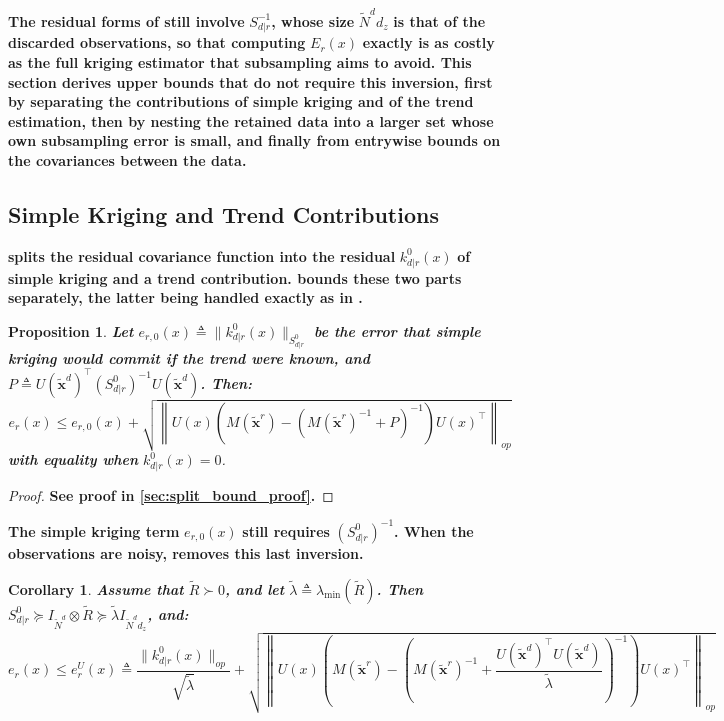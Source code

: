 \documentclass[preprint]{elsarticle}
\newtheorem{proposition}{Proposition}
\newtheorem{corollary}{Corollary}[proposition]
\begin{document}
\textbf{The residual forms of  still involve} $S_{d|r}^{-1}$\textbf{, whose size} $\tilde{N}^dd_z$ \textbf{is that of the discarded observations, so that computing} $E_r(x)$ \textbf{exactly is as costly as the full kriging estimator that subsampling aims to avoid. This section derives upper bounds that do not require this inversion, first by separating the contributions of simple kriging and of the trend estimation, then by nesting the retained data into a larger set whose own subsampling error is small, and finally from entrywise bounds on the covariances between the data.}

\subsection{Simple Kriging and Trend Contributions}\label{sec:split_bound}

\textbf{ splits the residual covariance function into the residual} $k^0_{d|r}(x)$ \textbf{of simple kriging and a trend contribution.  bounds these two parts separately, the latter being handled exactly as in .}

\begin{proposition}
    \textbf{Let} $e_{r,0}(x)\triangleq\|k^0_{d|r}(x)\|_{S^0_{d|r}}$ \textbf{be the error that simple kriging would commit if the trend were known, and} $P\triangleq U(\tilde{\mathbf{x}}^d)^\top \left(S^0_{d|r}\right)^{-1}U(\tilde{\mathbf{x}}^d)$\textbf{. Then:}
    \begin{equation*}
        e_r(x)\leq e_{r,0}(x)+\sqrt{\left\|U(x)\left(M(\tilde{\mathbf{x}}^r)-\left(M(\tilde{\mathbf{x}}^r)^{-1}+P\right)^{-1}\right)U(x)^\top\right\|_{op}}
    \end{equation*}
    \textbf{with equality when} $k^0_{d|r}(x)=0$.\label{th:split_bound}
\end{proposition}

\begin{proof}
    \textbf{See proof in \cref{sec:split_bound_proof}.}
\end{proof}

\textbf{The simple kriging term} $e_{r,0}(x)$ \textbf{still requires} $\left(S^0_{d|r}\right)^{-1}$\textbf{. When the observations are noisy,  removes this last inversion.}

\begin{corollary}
    \textbf{Assume that} $\tilde{R}\succ0$\textbf{, and let} $\tilde{\lambda}\triangleq\lambda_{\min}(\tilde{R})$\textbf{. Then} $S^0_{d|r}\succeq I_{\tilde{N}^d}\otimes\tilde{R}\succeq\tilde{\lambda}I_{\tilde{N}^dd_z}$\textbf{, and:}
    \begin{equation*}
        e_r(x)\leq e_r^U(x)\triangleq\frac{\|k^0_{d|r}(x)\|_{op}}{\sqrt{\tilde{\lambda}}}+\sqrt{\left\|U(x)\left(M(\tilde{\mathbf{x}}^r)-\left(M(\tilde{\mathbf{x}}^r)^{-1}+\frac{U(\tilde{\mathbf{x}}^d)^\top U(\tilde{\mathbf{x}}^d)}{\tilde{\lambda}}\right)^{-1}\right)U(x)^\top\right\|_{op}}
    \end{equation*}\label{th:computable_bound}
    \vspace{-\baselineskip}
\end{corollary}
\end{document}
